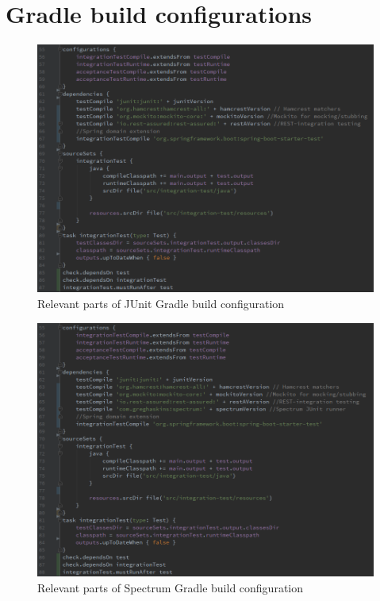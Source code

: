 \chapter{Gradle build configurations}
\label{chapter:gradle-build}

\begin{figure}[ht]
  \begin{center}
    \includegraphics[width=13.7cm]{images/junit-build.png}
    \caption{Relevant parts of JUnit Gradle build configuration}
    \label{fig:junit-build}
  \end{center}
\end{figure}

\begin{figure}[ht]
  \begin{center}
    \includegraphics[width=13.7cm]{images/spectrum-build.png}
    \caption{Relevant parts of Spectrum Gradle build configuration}
    \label{fig:spectrum-build}
  \end{center}
\end{figure}

